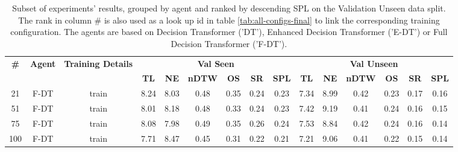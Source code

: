 \begin{table}
\centering
\caption{\label{tab:instruction_encoding_full}Subset of experiments' results, grouped by agent and ranked by descending SPL on the Validation Unseen data split. The rank in column \# is also used as a look up id in table \ref{tab:all-configs-final} to link the corresponding training configuration.     \newline The agents are based on Decision Transformer ('DT'), Enhanced Decision Transformer ('E-DT') or Full Decision Transformer ('F-DT').}
\begin{tabular}{@{\hskip3pt}c@{\hskip3pt}c@{\hskip3pt}c@{\hskip3pt}c@{\hskip3pt}c@{\hskip3pt}c@{\hskip3pt}c@{\hskip3pt}c@{\hskip3pt}c@{\hskip3pt}c@{\hskip3pt}c@{\hskip3pt}c@{\hskip3pt}c@{\hskip3pt}c@{\hskip3pt}c}
\toprule
\textbf{\#} & \textbf{Agent} & \textbf{Training Details} & \multicolumn{6}{c}{\textbf{Val Seen}} & \multicolumn{6}{c}{\textbf{Val Unseen}} \\
 \textbf{~} &     \textbf{~} &                \textbf{~} &       \textbf{TL} & \textbf{NE} & \textbf{nDTW} & \textbf{OS} & \textbf{SR} & \textbf{SPL} &         \textbf{TL} & \textbf{NE} & \textbf{nDTW} & \textbf{OS} & \textbf{SR} & \textbf{SPL} \\
\midrule
         21 &           F-DT &                     train &              8.24 &        8.03 &          0.48 &        0.35 &        0.24 &         0.23 &                7.34 &        8.99 &          0.42 &        0.23 &        0.17 &         0.16 \\
         51 &           F-DT &                     train &              8.01 &        8.18 &          0.48 &        0.33 &        0.24 &         0.23 &                7.42 &        9.19 &          0.41 &        0.24 &        0.16 &         0.15 \\
         75 &           F-DT &                     train &              8.08 &        7.98 &          0.49 &        0.35 &        0.26 &         0.24 &                7.53 &        8.84 &          0.42 &        0.24 &        0.16 &         0.14 \\
        100 &           F-DT &                     train &              7.71 &        8.47 &          0.45 &        0.31 &        0.22 &         0.21 &                7.21 &        9.06 &          0.41 &        0.22 &        0.15 &         0.14 \\
\bottomrule
\end{tabular}
\end{table}
